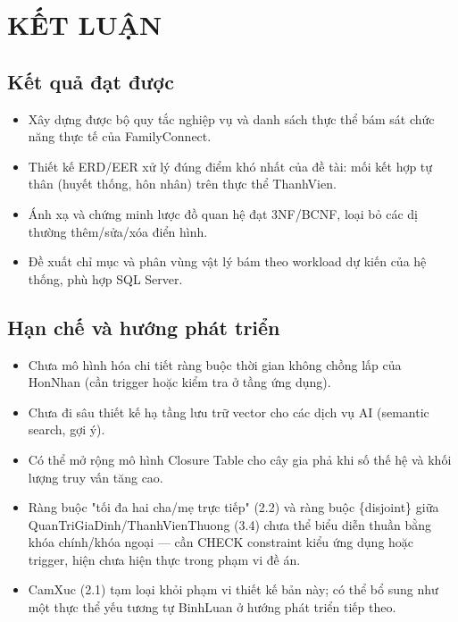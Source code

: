 \chapter{KẾT LUẬN}

\section{Kết quả đạt được}

\begin{itemize}
  \item Xây dựng được bộ quy tắc nghiệp vụ và danh sách thực thể bám sát chức năng thực tế của FamilyConnect.
  \item Thiết kế ERD/EER xử lý đúng điểm khó nhất của đề tài: mối kết hợp tự thân (huyết thống, hôn nhân) trên thực thể ThanhVien.
  \item Ánh xạ và chứng minh lược đồ quan hệ đạt 3NF/BCNF, loại bỏ các dị thường thêm/sửa/xóa điển hình.
  \item Đề xuất chỉ mục và phân vùng vật lý bám theo workload dự kiến của hệ thống, phù hợp SQL Server.
\end{itemize}

\section{Hạn chế và hướng phát triển}

\begin{itemize}
  \item Chưa mô hình hóa chi tiết ràng buộc thời gian không chồng lấp của HonNhan (cần trigger hoặc kiểm tra ở tầng ứng dụng).
  \item Chưa đi sâu thiết kế hạ tầng lưu trữ vector cho các dịch vụ AI (semantic search, gợi ý).
  \item Có thể mở rộng mô hình Closure Table cho cây gia phả khi số thế hệ và khối lượng truy vấn tăng cao.
  \item Ràng buộc "tối đa hai cha/mẹ trực tiếp" (2.2) và ràng buộc \{disjoint\} giữa QuanTriGiaDinh/ThanhVienThuong (3.4) chưa thể biểu diễn thuần bằng khóa chính/khóa ngoại --- cần CHECK constraint kiểu ứng dụng hoặc trigger, hiện chưa hiện thực trong phạm vi đề án.
  \item CamXuc (2.1) tạm loại khỏi phạm vi thiết kế bản này; có thể bổ sung như một thực thể yếu tương tự BinhLuan ở hướng phát triển tiếp theo.
\end{itemize}

